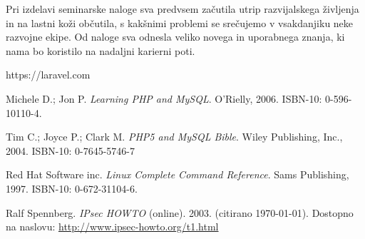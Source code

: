 \documentclass[a4paper,12pt]{report}
\begin{document}
Pri izdelavi seminarske naloge sva predvsem začutila utrip razvijalskega življenja in na lastni koži občutila, s kakšnimi problemi se srečujemo v vsakdanjiku neke razvojne ekipe. Od naloge sva odnesla veliko novega in uporabnega znanja, ki nama bo koristilo na nadaljni karierni poti.

\begin{thebibliography}{99}
\addtocounter{chapter}{1}

 https://laravel.com 

 Michele D.; Jon P. \emph{Learning PHP and MySQL}. O'Rielly, 2006. ISBN-10: 0-596-10110-4.

 Tim C.; Joyce P.; Clark M. \emph{PHP5 and MySQL Bible}. Wiley Publishing, Inc., 2004. ISBN-10: 0-7645-5746-7

 Red Hat Software inc. \emph{Linux Complete Command Reference}. Sams Publishing, 1997. ISBN-10: 0-672-31104-6.

 Ralf Spennberg. \emph{IPsec HOWTO} (online). 2003. (citirano \today). Dostopno na naslovu:
\url{http://www.ipsec-howto.org/t1.html}

\end{thebibliography}

\end{document}
